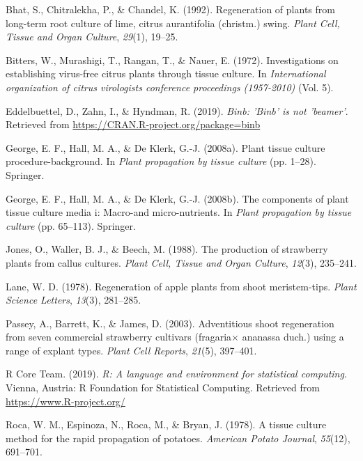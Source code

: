 \documentclass[
  man]{apa6}
\begin{document}
\leavevmode\hypertarget{ref-bhat1992regeneration}{}%
Bhat, S., Chitralekha, P., \& Chandel, K. (1992). Regeneration of plants from long-term root culture of lime, citrus aurantifolia (christm.) swing. \emph{Plant Cell, Tissue and Organ Culture}, \emph{29}(1), 19--25.

\leavevmode\hypertarget{ref-bitters1972investigations}{}%
Bitters, W., Murashigi, T., Rangan, T., \& Nauer, E. (1972). Investigations on establishing virus-free citrus plants through tissue culture. In \emph{International organization of citrus virologists conference proceedings (1957-2010)} (Vol. 5).

\leavevmode\hypertarget{ref-R-binb}{}%
Eddelbuettel, D., Zahn, I., \& Hyndman, R. (2019). \emph{Binb: 'Binb' is not 'beamer'}. Retrieved from \url{https://CRAN.R-project.org/package=binb}

\leavevmode\hypertarget{ref-george2008plant}{}%
George, E. F., Hall, M. A., \& De Klerk, G.-J. (2008a). Plant tissue culture procedure-background. In \emph{Plant propagation by tissue culture} (pp. 1--28). Springer.

\leavevmode\hypertarget{ref-george2008components}{}%
George, E. F., Hall, M. A., \& De Klerk, G.-J. (2008b). The components of plant tissue culture media i: Macro-and micro-nutrients. In \emph{Plant propagation by tissue culture} (pp. 65--113). Springer.

\leavevmode\hypertarget{ref-jones1988production}{}%
Jones, O., Waller, B. J., \& Beech, M. (1988). The production of strawberry plants from callus cultures. \emph{Plant Cell, Tissue and Organ Culture}, \emph{12}(3), 235--241.

\leavevmode\hypertarget{ref-lane1978regeneration}{}%
Lane, W. D. (1978). Regeneration of apple plants from shoot meristem-tips. \emph{Plant Science Letters}, \emph{13}(3), 281--285.

\leavevmode\hypertarget{ref-passey2003adventitious}{}%
Passey, A., Barrett, K., \& James, D. (2003). Adventitious shoot regeneration from seven commercial strawberry cultivars (fragaria\(\times\) ananassa duch.) using a range of explant types. \emph{Plant Cell Reports}, \emph{21}(5), 397--401.

\leavevmode\hypertarget{ref-R-base}{}%
R Core Team. (2019). \emph{R: A language and environment for statistical computing}. Vienna, Austria: R Foundation for Statistical Computing. Retrieved from \url{https://www.R-project.org/}

\leavevmode\hypertarget{ref-roca1978tissue}{}%
Roca, W. M., Espinoza, N., Roca, M., \& Bryan, J. (1978). A tissue culture method for the rapid propagation of potatoes. \emph{American Potato Journal}, \emph{55}(12), 691--701.
\end{document}
